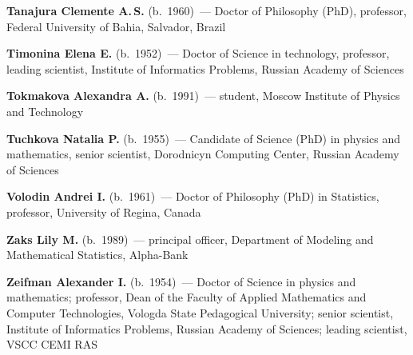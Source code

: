 \begin{multicols}{2}
\vspace*{4pt}

\noindent
\textbf{Tanajura Clemente A.\,S.}  (b.\ 1960)~--- Doctor of Philosophy (PhD), professor, 
Federal University of Bahia, Salvador, Brazil

\vspace*{4pt}

\noindent
\textbf{Timonina Elena E.} (b.\ 1952)~--- Doctor of Science in technology, professor,
leading scientist, Institute of Informatics Problems,  Russian Academy of Sciences

\vspace*{4pt}

\noindent
\textbf{Tokmakova Alexandra A.} (b.\ 1991)~--- student, Moscow Institute of
Physics and Technology

\vspace*{4pt}

\noindent
\textbf{Tuchkova Natalia P.} (b.\ 1955)~--- Candidate of Science (PhD) 
in physics and mathematics, senior scientist, Dorodnicyn Computing Center, 
Russian Academy of Sciences

\vspace*{4pt}

\noindent
\textbf{Volodin Andrei I.} (b.\ 1961)~--- Doctor of Philosophy (PhD)
in Statistics, professor, University of Regina, Canada


\vspace*{4pt}


\noindent
\textbf{Zaks Lily M.} (b.\ 1989)~--- principal officer, Department of Modeling and 
Mathematical Statistics, Alpha-Bank


\vspace*{4pt}

\noindent
\textbf{Zeifman Alexander I.} (b.\ 1954)~--- Doctor of Science in physics 
and mathematics; professor, Dean of the Faculty of Applied Mathematics and Computer Technologies,
Vologda State Pedagogical University; senior scientist,
Institute of Informatics Problems, Russian Academy of Sciences;
leading scientist, VSCC CEMI RAS  



\def\leftfootline{\small{\textbf{\thepage}
\hfill ИНФОРМАТИКА И ЕЁ ПРИМЕНЕНИЯ\ \ \ том~6\ \ \ выпуск~4\ \ \ 2012}
}%
 \def\rightfootline{\small{ИНФОРМАТИКА И ЕЁ ПРИМЕНЕНИЯ\ \ \ том~6\ \ \ выпуск~4\ \ \ 2012
\hfill \textbf{\thepage}}}



\end{multicols}
\newpage


\newpage